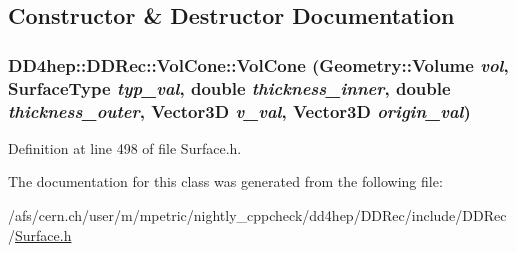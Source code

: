 \subsection{Constructor \& Destructor Documentation}
\hypertarget{class_d_d4hep_1_1_d_d_rec_1_1_vol_cone_a99d5b9981b298e9bbde8929511e157d1}{
\subsubsection[{VolCone}]{\setlength{\rightskip}{0pt plus 5cm}DD4hep::DDRec::VolCone::VolCone ({\bf Geometry::Volume} {\em vol}, \/  {\bf SurfaceType} {\em typ\_\-val}, \/  double {\em thickness\_\-inner}, \/  double {\em thickness\_\-outer}, \/  {\bf Vector3D} {\em v\_\-val}, \/  {\bf Vector3D} {\em origin\_\-val})}}
\label{class_d_d4hep_1_1_d_d_rec_1_1_vol_cone_a99d5b9981b298e9bbde8929511e157d1}


Definition at line 498 of file Surface.h.

The documentation for this class was generated from the following file:\begin{DoxyCompactItemize}
\item 
/afs/cern.ch/user/m/mpetric/nightly\_\-cppcheck/dd4hep/DDRec/include/DDRec/\hyperlink{_surface_8h}{Surface.h}\end{DoxyCompactItemize}
